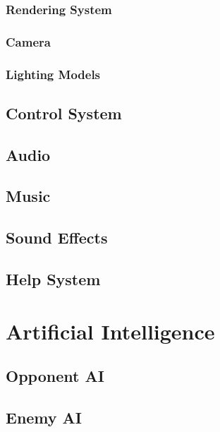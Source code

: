 \documentclass[12pt,titlepage]{article}
\begin{document}
\subsubsection{Rendering System}

\subsubsection{Camera}

\subsubsection{Lighting Models}

\subsection{Control System}

\subsection{Audio}

\subsection{Music}

\subsection{Sound Effects}

\subsection{Help System}

\newpage
\section{Artificial Intelligence}

\subsection{Opponent AI}

\subsection{Enemy AI}
\end{document}
